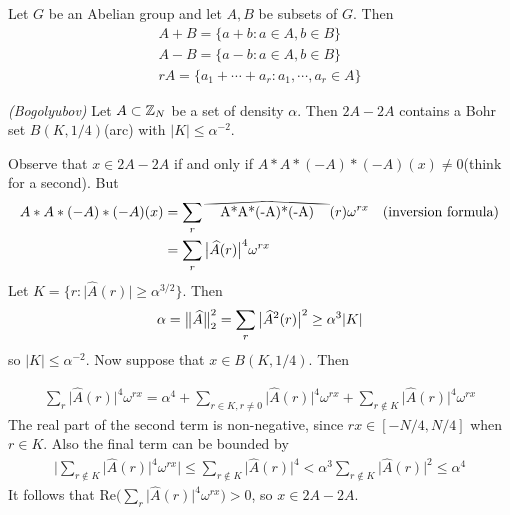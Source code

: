 \documentclass[10pt,a4paper]{report}
\newcommand\reallywidehat[1]{%
\savestack{\tmpbox}{\stretchto{%
  \scaleto{%
    \scalerel*[\widthof{\ensuremath{#1}}]{\kern-.6pt\bigwedge\kern-.6pt}%
    {\rule[-\textheight/2]{1ex}{\textheight}}%
  }{\textheight}%
}{0.5ex}}%
\stackon[1pt]{#1}{\tmpbox}%
}
\renewcommand{\hat}{\widehat}
\newenvironment{proof}
{\begin{changemargin}{1cm}{0.5cm}
	}%
	{\end{changemargin}
}
\begin{document}
 Let $G$ be an Abelian group and let $A,B$ be subsets of $G$. Then 
\begin{align*}
A+B = \{ a+b: a\in A, b\in B\} \\
A-B = \{a-b: a\in A, b\in B\} \\
rA = \{a_1+ \cdots + a_r : a_1,\cdots,a_r \in A  \}
\end{align*}
\s

 \emph{(Bogolyubov)} Let $A\subset \mathbb{Z}_N$ be a set of density $\alpha$. Then $2A-2A$ contains a Bohr set $B(K,1/4)$(arc) with $|K|\leq \alpha^{-2}$.

\begin{proof}
\pf Observe that $x\in 2A-2A$ if and only if $A*A*(-A)*(-A)(x) \neq 0$(think for a second). But
\begin{align*}
A*A*(-A)*(-A)(x) &= \sum_{r} \reallywidehat{A*A*(-A)*(-A)}(r) \omega^{rx} \quad \text{(inversion formula)} \\
&= \sum_r  \big| \hat{A}(r) \big|^4 \omega^{rx}
\end{align*}
Let $K = \{r: \big| \hat{A}(r) \big| \geq \alpha^{3/2} \}$. Then 
\begin{align*}
\alpha = \norms{\hat{A}}{2}^2 = \sum_{r} \big| \hat{A}^2(r) \big|^2 \geq \alpha^3 |K|
\end{align*}
so $|K| \leq \alpha^{-2}$.
\quad Now suppose that $x\in B(K,1/4)$. Then 

\begin{align*}
\sum_{r} \big| \hat{A}(r)\big|^4 \omega^{rx}  = \alpha^4 + \sum_{r\in K,r\neq 0} \big| \hat{A}(r)\big|^4 \omega^{rx} + \sum_{r \notin K} \big| \hat{A}(r)\big|^4 \omega^{rx}
\end{align*}
The real part of the second term is non-negative, since $rx\in [-N/4,N/4]$ when $r\in K$. Also the final term can be bounded by
\begin{align*}
\Big| \sum_{r \notin K} \big| \hat{A}(r)\big|^4 \omega^{rx} \Big| \leq \sum_{r \notin K} \big| \hat{A}(r)\big|^4 < \alpha^3 \sum_{r \notin K} \big| \hat{A}(r)\big|^2 \leq \alpha^4
\end{align*}
It follows that $\text{Re}\Big( \sum_r  \big| \hat{A}(r) \big|^4 \omega^{rx} \Big) >0$, so $x\in 2A-2A$.

\eop
\end{proof}
\s
\end{document}
